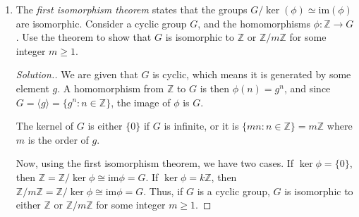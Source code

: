 \documentclass{article}
\newcommand{\sk}{\smallskip}
\newcommand{\Z}{\mathbb{Z}}
\begin{document}
\begin{enumerate}
\begin{enumerate}
\begin{proof}[Solution.]
        \sk

        Third, suppose $h_1 \in \text{im}\phi$. We want to show that $h_1^{-1} \in \text{im}\phi$. Since $h_1 \in \text{im}\phi$, there exists a $g_1 \in G$ such that $\phi(g_1) = h_1$. Taking the inverse of both sides and using the fact that $\phi$ is a homomorphism, we get $h_1^{-1} = \phi(g_1)^{-1} = \phi(g_1^{-1})$. Since $G$ is a group and $g_1 \in G$, $g_1^{-1} \in G$, and so $h_1^{-1} \in \text{im}\phi$. 

        \sk

        By the two-step subgroup test, since $\text{im}\phi$ is non-empty, it is a subgroup of $H$.

        \end{proof}
        
        \item The \textit{first isomorphism theorem} states that the groups $G/\ker(\phi) \simeq \text{im}(\phi)$ are isomorphic. Consider a cyclic group $G$, and the homomorphisms $\phi: \Z \rightarrow G$. Use the theorem to show that $G$ is isomorphic to $\Z$ or $\Z/m\Z$ for some integer $m \geq 1$. 

        \begin{proof}[Solution.]

        We are given that $G$ is cyclic, which means it is generated by some element $g$. A homomorphism from $\Z$ to $G$ is then $\phi(n) = g^n$, and since $G = \langle g \rangle = \{g^n : n \in \Z\}$, the image of $\phi$ is $G$. 

        \sk

        The kernel of $G$ is either $\{0\}$ if $G$ is infinite, or it is $\{mn : n \in \Z\} = m\Z$ where $m$ is the order of $g$. 

        \sk

        Now, using the first isomorphism theorem, we have two cases. If $\ker \phi = \{0\}$, then $\Z = \Z/\ker \phi \cong \text{im}\phi = G$. If $\ker \phi = k\Z$, then $\Z/m\Z = \Z/\ker\phi \cong \text{im}\phi = G$. Thus, if $G$ is a cyclic group, $G$ is isomorphic to either $\Z$ or $\Z/m\Z$ for some integer $m \geq 1$.
            
        \end{proof}
    \end{enumerate}
\end{enumerate}
\end{document}
